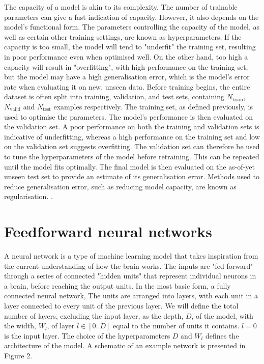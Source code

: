\documentclass[12pt]{article}
\begin{document}
The capacity of a model is akin to its complexity. The number of trainable parameters can give a fast indication of capacity. However, it also depends on the model's functional form. The parameters controlling the capacity of the model, as well as certain other training settings, are known as hyperparameters. If the capacity is too small, the model will tend to "underfit" the training set, resulting in poor performance even when optimised well. On the other hand, too high a capacity will result in "overfitting", with high performance on the training set, but the model may have a high generalisation error, which is the model's error rate when evaluating it on new, unseen data. Before training begins, the entire dataset is often split into training, validation, and test sets, containing $N_{\mathrm{train}}$, $N_{\mathrm{valid}}$ and $N_{\mathrm{test}}$ examples respectively. The training set, as defined previously, is used to optimise the parameters. The model's performance is then evaluated on the validation set. A poor performance on both the training and validation sets is indicative of underfitting, whereas a high performance on the training set and low on the validation set suggests overfitting. The validation set can therefore be used to tune the hyperparameters of the model before retraining. This can be repeated until the model fits optimally. The final model is then evaluated on the as-of-yet unseen test set to provide an estimate of its generalisation error. Methods used to reduce generalisation error, such as reducing model capacity, are known as regularisation. \cite{Goodfellow16}.
\section{Feedforward neural networks}
A neural network is a type of machine learning model that takes inspiration from the current understanding of how the brain works. The inputs are "fed forward" through a series of connected "hidden units" that represent individual neurons in a brain, before reaching the output units. In the most basic form, a fully connected neural network, The units are arranged into layers, with each unit in a layer connected to every unit of the previous layer. We will define the total number of layers, excluding the input layer, as the depth, $D$, of the model, with the width, $W_l$, of layer $l\in[0..D]$ equal to the number of units it contains. $l=0$ is the input layer. The choice of the hyperparameters $D$ and $W_l$ defines the architecture of the model. A schematic of an example network is presented in Figure 2. 
\end{document}
